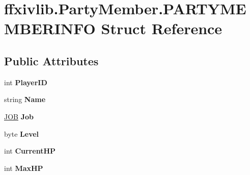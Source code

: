 \hypertarget{structffxivlib_1_1_party_member_1_1_p_a_r_t_y_m_e_m_b_e_r_i_n_f_o}{\section{ffxivlib.\-Party\-Member.\-P\-A\-R\-T\-Y\-M\-E\-M\-B\-E\-R\-I\-N\-F\-O Struct Reference}
\label{structffxivlib_1_1_party_member_1_1_p_a_r_t_y_m_e_m_b_e_r_i_n_f_o}
}
\subsection*{Public Attributes}
\begin{DoxyCompactItemize}
\item 
\hypertarget{structffxivlib_1_1_party_member_1_1_p_a_r_t_y_m_e_m_b_e_r_i_n_f_o_a58cd6e399a19de16d25ddd42e8518144}{int {\bfseries Player\-I\-D}}\label{structffxivlib_1_1_party_member_1_1_p_a_r_t_y_m_e_m_b_e_r_i_n_f_o_a58cd6e399a19de16d25ddd42e8518144}

\item 
\hypertarget{structffxivlib_1_1_party_member_1_1_p_a_r_t_y_m_e_m_b_e_r_i_n_f_o_a558a18278b2c9ecc45ead1e38fbc151a}{string {\bfseries Name}}\label{structffxivlib_1_1_party_member_1_1_p_a_r_t_y_m_e_m_b_e_r_i_n_f_o_a558a18278b2c9ecc45ead1e38fbc151a}

\item 
\hypertarget{structffxivlib_1_1_party_member_1_1_p_a_r_t_y_m_e_m_b_e_r_i_n_f_o_afed8db50d29cf44fb3a0c2eb49b6d39b}{\hyperlink{namespaceffxivlib_a7273810711af045adb7151580e025a86}{J\-O\-B} {\bfseries Job}}\label{structffxivlib_1_1_party_member_1_1_p_a_r_t_y_m_e_m_b_e_r_i_n_f_o_afed8db50d29cf44fb3a0c2eb49b6d39b}

\item 
\hypertarget{structffxivlib_1_1_party_member_1_1_p_a_r_t_y_m_e_m_b_e_r_i_n_f_o_a05295eb7f0790435d82888e9c5f08d1a}{byte {\bfseries Level}}\label{structffxivlib_1_1_party_member_1_1_p_a_r_t_y_m_e_m_b_e_r_i_n_f_o_a05295eb7f0790435d82888e9c5f08d1a}

\item 
\hypertarget{structffxivlib_1_1_party_member_1_1_p_a_r_t_y_m_e_m_b_e_r_i_n_f_o_a1d9427bd9ce30843b7d4c4e29c28a16a}{int {\bfseries Current\-H\-P}}\label{structffxivlib_1_1_party_member_1_1_p_a_r_t_y_m_e_m_b_e_r_i_n_f_o_a1d9427bd9ce30843b7d4c4e29c28a16a}

\item 
\hypertarget{structffxivlib_1_1_party_member_1_1_p_a_r_t_y_m_e_m_b_e_r_i_n_f_o_a3e45ae06ea2e1098cf26eacd30c338fc}{int {\bfseries Max\-H\-P}}\label{structffxivlib_1_1_party_member_1_1_p_a_r_t_y_m_e_m_b_e_r_i_n_f_o_a3e45ae06ea2e1098cf26eacd30c338fc}


\end{DoxyCompactItemize}
